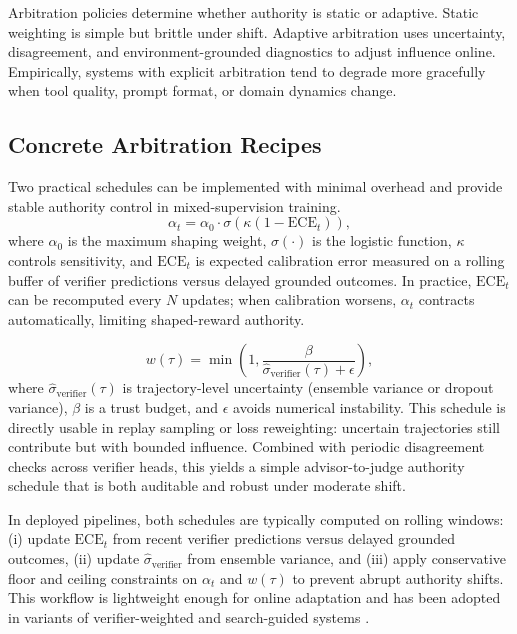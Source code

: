 ﻿\documentclass[conference]{IEEEtran}
\begin{document}
Arbitration policies determine whether authority is static or adaptive. Static weighting is simple but brittle under shift. Adaptive arbitration uses uncertainty, disagreement, and environment-grounded diagnostics to adjust influence online. Empirically, systems with explicit arbitration tend to degrade more gracefully when tool quality, prompt format, or domain dynamics change.

\subsection{Concrete Arbitration Recipes}
Two practical schedules can be implemented with minimal overhead and provide stable authority control in mixed-supervision training.
\begin{equation}
\alpha_t=\alpha_0\cdot \sigma\!\left(\kappa\left(1-\mathrm{ECE}_t\right)\right),
\label{eq:alpha_recipe}
\end{equation}
where $\alpha_0$ is the maximum shaping weight, $\sigma(\cdot)$ is the logistic function, $\kappa$ controls sensitivity, and $\mathrm{ECE}_t$ is expected calibration error measured on a rolling buffer of verifier predictions versus delayed grounded outcomes. In practice, $\mathrm{ECE}_t$ can be recomputed every $N$ updates; when calibration worsens, $\alpha_t$ contracts automatically, limiting shaped-reward authority.

\begin{equation}
w(\tau)=\min\!\left(1,\frac{\beta}{\hat{\sigma}_{\text{verifier}}(\tau)+\epsilon}\right),
\label{eq:weight_recipe}
\end{equation}
where $\hat{\sigma}_{\text{verifier}}(\tau)$ is trajectory-level uncertainty (ensemble variance or dropout variance), $\beta$ is a trust budget, and $\epsilon$ avoids numerical instability. This schedule is directly usable in replay sampling or loss reweighting: uncertain trajectories still contribute but with bounded influence. Combined with periodic disagreement checks across verifier heads, this yields a simple advisor-to-judge authority schedule that is both auditable and robust under moderate shift.

In deployed pipelines, both schedules are typically computed on rolling windows: (i) update $\mathrm{ECE}_t$ from recent verifier predictions versus delayed grounded outcomes, (ii) update $\hat{\sigma}_{\text{verifier}}$ from ensemble variance, and (iii) apply conservative floor and ceiling constraints on $\alpha_t$ and $w(\tau)$ to prevent abrupt authority shifts. This workflow is lightweight enough for online adaptation and has been adopted in variants of verifier-weighted and search-guided systems \cite{arxiv_p_2602_06493,arxiv_p_2602_12579,arxiv_p_2602_07848,arxiv_p_2602_02395}.
\end{document}
